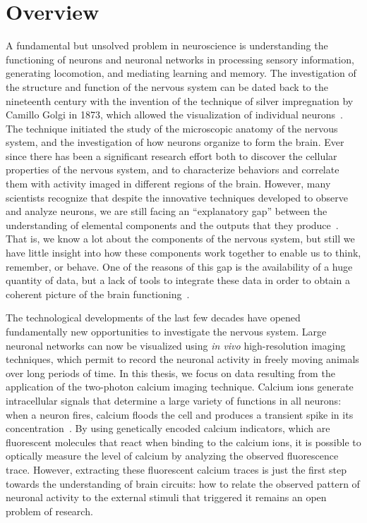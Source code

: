 

\section*{Overview}

A fundamental but unsolved problem in neuroscience is understanding the functioning of neurons and neuronal networks in processing sensory information, generating locomotion, and mediating learning and memory.
The investigation of the structure and function of the nervous system can be dated back to the nineteenth century with the invention of the technique of silver impregnation by Camillo Golgi in 1873, which allowed the visualization of individual neurons~\parencite{drouin2015}. The technique initiated the study of the microscopic anatomy of the nervous system, and the investigation of how neurons organize to form the brain. 
Ever since there has been a significant research effort both to discover the cellular properties of the nervous system, and to characterize behaviors and correlate them with activity imaged in different regions of the brain.
However, many scientists recognize that despite the innovative techniques developed to observe and analyze neurons, we are still facing an ``explanatory gap'' between the understanding of elemental components and the outputs that they produce~\parencite{parker2006,parker2010,dudai2004}. That is, we know a lot about the components of the nervous system, but still we have little insight into how these components work together to enable us to think, remember, or behave. One of the reasons of this gap is the availability of a huge quantity of data, but a lack of tools to integrate these data in order to obtain a coherent picture of the brain functioning~\parencite{parker2010}.

The technological developments of the last few decades have opened fundamentally new opportunities to investigate the nervous system. Large neuronal networks can now be visualized using \textit{in vivo} high-resolution imaging techniques, which permit to record the neuronal activity in freely moving animals over long periods of time. In this thesis, we focus on data resulting from the application of the two-photon calcium imaging technique. Calcium ions generate intracellular signals that determine a large variety of functions in all neurons: when a neuron fires, calcium floods the cell and produces a transient spike in its concentration~\parencite{grienberger2012}. By using genetically encoded calcium indicators, which are fluorescent molecules that react when binding to the calcium ions, it is possible to optically measure the level of calcium by analyzing the observed fluorescence trace. 
However, extracting these fluorescent calcium traces is just the first step towards the understanding of brain circuits: how to relate the observed pattern of neuronal activity to the external stimuli that triggered it remains an open problem of research. 

